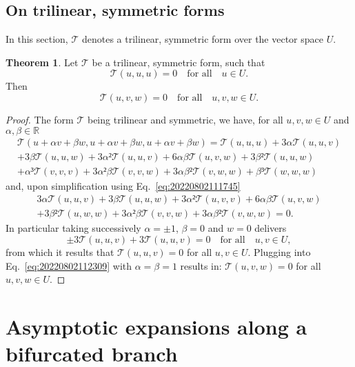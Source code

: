 \documentclass[12pt, final]{scrartcl}
\theoremstyle{definition}
\newtheorem{theorem}{Theorem}
\begin{document}
\subsection{On trilinear, symmetric forms}

In this section, $𝒯$ denotes a trilinear, symmetric form over the vector space
$U$.

\begin{theorem}
  \label{thr:20220802112835}
  Let $𝒯$ be a trilinear, symmetric form, such that
  \begin{equation}
    \label{eq:20220802111745}
    𝒯(u, u, u) = 0 \quad \text{for all} \quad u ∈ U.
  \end{equation}
  Then
  \begin{equation}
    𝒯(u, v, w) = 0 \quad \text{for all} \quad u, v, w ∈ U.
  \end{equation}
\end{theorem}
\begin{proof}
  The form $𝒯$ being trilinear and symmetric, we have, for all $u, v, w ∈ U$
  and $α, β ∈ ℝ$
  \begin{multline*}
    𝒯(u + αv + βw, u + αv + βw, u + αv + βw) = 𝒯(u, u, u) + 3α 𝒯(u, u, v)\\
    + 3β 𝒯(u, u, w) + 3α² 𝒯(u, u, v) + 6 α β 𝒯(u, v, w) + 3 β² 𝒯(u, u, w)\\
    + α³ 𝒯(v, v, v) + 3 α² β 𝒯(v, v, w) + 3 α β² 𝒯(v, w, w) + β³ 𝒯(w, w, w)
  \end{multline*}
  and, upon simplification using Eq.~\eqref{eq:20220802111745}
  \begin{multline}
    \label{eq:20220802112309}
    3α 𝒯(u, u, v) + 3β 𝒯(u, u, w) + 3α² 𝒯(u, v, v) + 6 α β 𝒯(u, v, w)\\
    + 3 β² 𝒯(u, w, w) + 3 α² β 𝒯(v, v, w) + 3 α β² 𝒯(v, w, w) = 0.
  \end{multline}
  In particular taking successively $α = ±1$, $β = 0$ and $w = 0$ delivers
  \begin{equation*}
    ±3 𝒯(u, u, v) + 3 𝒯(u, u, v) = 0 \quad \text{for all} \quad u, v ∈ U,
  \end{equation*}
  from which it results that $𝒯(u, u, v) = 0$ for all $u, v ∈ U$. Plugging
  into Eq.~\eqref{eq:20220802112309} with $α = β = 1$ results in:
  $𝒯(u, v, w) = 0$ for all $u, v, w ∈ U$.
\end{proof}

\section{Asymptotic expansions along a bifurcated branch}
\label{sec:20220905060440}
\end{document}
